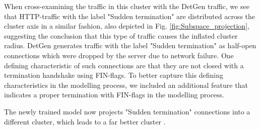 \documentclass[conference]{IEEEtran}
\begin{document}
When cross-examining the traffic in this cluster with the DetGen traffic, we see that HTTP-traffic with the label "Sudden termination" are distributed across the cluster axis in a similar fashion, also depicted in Fig. \ref{fig:Subspace_projection}, suggesting the conclusion that this type of traffic causes the inflated cluster radius. DetGen generates traffic with the label "Sudden termination" as half-open connections which were dropped by the server due to network failure. One defining characteristic of such connections are that they are not closed with a termination handshake using FIN-flags. To better capture this defining characteristics in the modelling process, we included an additional feature that indicates a proper termination with FIN-flags in the modelling process. 

The newly trained model now projects "Sudden termination" connections into a different cluster, which leads to a far better cluster .




\end{document}
